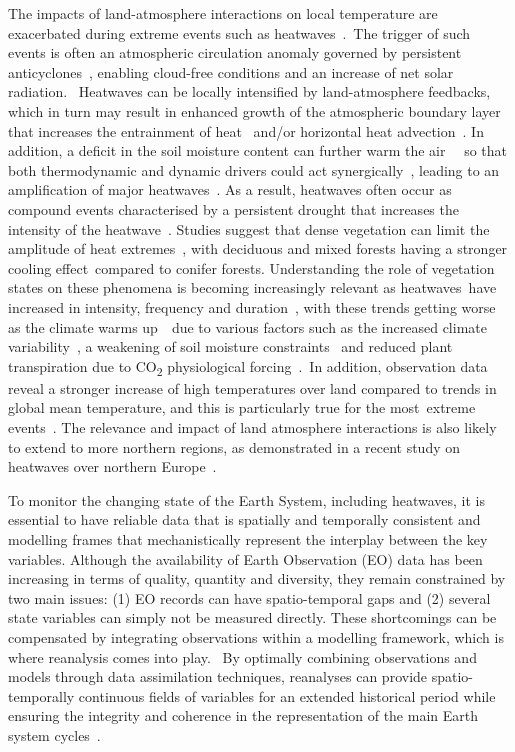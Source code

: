 \documentclass[gmd, manuscript]{copernicus}
\begin{document}
The impacts of land-atmosphere interactions on local temperature are
exacerbated during extreme events such as
heatwaves~\citep{jia2019land}.~The trigger of such events is often an
atmospheric circulation anomaly governed by persistent
anticyclones~\citep{schubert2014northern, brunner2018}, enabling cloud-free conditions and an
increase of net solar radiation.~ Heatwaves can be locally intensified
by land-atmosphere feedbacks, which in turn may result in enhanced
growth of the atmospheric boundary layer that increases the entrainment
of heat~\citep{Miralles_2011} and/or horizontal heat
advection~\citep{schumacher2019amplification}. In addition, a deficit in the soil
moisture content can further warm the air~\citep{hauser2016role}~ so that
both thermodynamic and dynamic drivers could act
synergically~\citep{coumou2018influence}, leading to an amplification of major
heatwaves~\citep{horton2016review}. As a result, heatwaves often occur
as compound events characterised by a persistent drought that increases
the intensity of the heatwave~\citep[e.g.][]{miralles2012soil,Seneviratne_2010}. Studies
suggest that dense vegetation can limit the amplitude of heat
extremes~\citep{renaud2009comparison}, with deciduous and mixed forests having a
stronger cooling effect~compared to conifer forests. Understanding the
role of vegetation states on these phenomena is becoming increasingly
relevant as heatwaves~have increased in intensity, frequency and
duration~\citep{perkins2020increasing}, with these trends getting worse as the
climate warms up~\citep{christidis2015,coumou2018influence}~due to various factors such as the
increased climate variability~\citep{schar2004role}, a weakening of soil
moisture constraints~\citep{Rasmijn_2018} and reduced plant transpiration
due to CO\textsubscript{2} physiological forcing~\citep{skinner2018amplificationa}.~In
addition, observation data reveal a stronger increase of high
temperatures over land compared to trends in global mean temperature,
and this is particularly true for the most~extreme
events~\citep{seneviratne2014no}. The relevance and impact of land atmosphere
interactions is also likely to extend to more northern regions, as
demonstrated in a recent study on heatwaves over northern
Europe~\citep{Dirmeyer_2021}.

To monitor the changing state of the Earth System, including heatwaves,
it is essential to have reliable data that is spatially and temporally
consistent and modelling frames that mechanistically represent the
interplay between the key variables. Although the availability of Earth
Observation (EO) data has been increasing in terms of quality, quantity
and diversity, they remain constrained by two main issues: (1) EO
records can have spatio-temporal gaps and (2) several state variables
can simply not be measured directly. These shortcomings can be
compensated by integrating observations within a modelling framework,
which is where {reanalysis }comes into play.~ By optimally combining
observations and models through data assimilation techniques, reanalyses
can provide spatio-temporally continuous fields of variables for an
extended historical period while ensuring the integrity and coherence in
the representation of the main Earth system cycles~\citep{Hersbach_2020, Dee_2011}.
\end{document}
